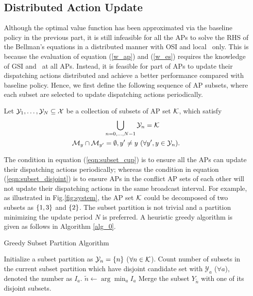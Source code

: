 \subsection{Distributed Action Update}
\label{subsec:ap_alg}
Although the optimal value function has been approximated via the baseline policy in the previous part, it is still infeasible for all the APs to solve the RHS of the Bellman's equations in a distributed manner with OSI and local \brlatency~only.
This is because the evaluation of equation (\ref{w_ap}) and (\ref{w_es}) requires the knowledge of GSI and \brlatency~at all APs.
Instead, it is feasible for part of APs to update their dispatching actions distributed and achieve a better performance compared with baseline policy.
Hence, we first define the following sequence of AP subsets, where each subset are selected to update dispatching actions periodically.
\begin{definition}
    Let $\mathcal{Y}_{1}, \dots, \mathcal{Y}_{N} \subseteq \mathcal{X}$ be a collection of subsets of AP set $\mathcal{K}$, which satisfy
    \begin{align}
        &\bigcup_{n=0,\dots,N-1} \mathcal{Y}_{n} = \mathcal{K}
        \label{eqn:subset_cup}
        \\
        \mathcal{M}_{y} \cap \mathcal{M}_{y'} &=\emptyset, y' \neq y~(\forall y',y \in \mathcal{Y}_{n}).
        \label{eqn:subset_disjoint}
    \end{align}
\end{definition}
The condition in equation (\ref{eqn:subset_cup}) is to ensure all the APs can update their dispatching actions periodically; whereas the condition in equation (\ref{eqn:subset_disjoint}) is to ensure APs in the conflict AP sets of each other will not update their dispatching actions in the same broadcast interval.
For example, as illustrated in Fig.\ref{fig:system}, the AP set $\mathcal{K}$ could be decomposed of two subsets as $\{1,3\}$ and $\{2\}$.
The subset partition is not trivial and {a partition minimizing the update period $N$ is preferred}.
A heuristic greedy algorithm is given as follows in Algorithm \ref{alg_0}.
\begin{algorithm}[ht]
    \caption{Greedy Subset Partition Algorithm}\label{alg_0}
    \DontPrintSemicolon %
    Initialize a subset partition as $\mathcal{Y}_{n} = \{n\}$ ($\forall n\in\mathcal{K}$).\;
    {
        Count number of subsets in the current subset partition which have disjoint candidate set with $\mathcal{Y}_a$ ($\forall a$), denoted the number as $I_{a}$.\;
        $\tilde{n} \gets \arg\min_{a} I_{a}$\;
        Merge the subset $Y_{\tilde{n}}$ with one of its disjoint subsets.\;
    }
\end{algorithm}

